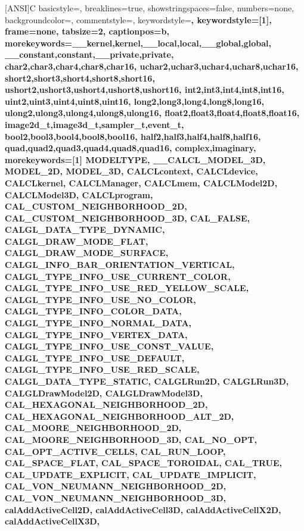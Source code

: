 \usepackage{verbatim}
\usepackage{xcolor}
\usepackage{listings}

 [ANSI]{C} 
{  basicstyle=\footnotesize\ttfamily,
	breaklines=true,
	showstringspaces=false,
	numbers=none,
	backgroundcolor=\color{white},
	commentstyle=\color{red},
	keywordstyle=\color{black}\bfseries,
	keywordstyle=[1]\color{black},   %
	frame=none,                     %
	tabsize=2,                      %
	captionpos=b,
	morekeywords={__kernel,kernel,__local,local,__global,global,%
		__constant,constant,__private,private,%
		char2,char3,char4,char8,char16,%
		uchar2,uchar3,uchar4,uchar8,uchar16,%
		short2,short3,short4,short8,short16,%
		ushort2,ushort3,ushort4,ushort8,ushort16,%
		int2,int3,int4,int8,int16,%
		uint2,uint3,uint4,uint8,uint16,%
		long2,long3,long4,long8,long16,%
		ulong2,ulong3,ulong4,ulong8,ulong16,%
		float2,float3,float4,float8,float16,%
		image2d_t,image3d_t,sampler_t,event_t,%
		bool2,bool3,bool4,bool8,bool16,%
		half2,half3,half4,half8,half16,%
		quad,quad2,quad3,quad4,quad8,quad16,%
		complex,imaginary},
	    morekeywords=[1]{               %
		MODELTYPE,
		__CALCL_MODEL_3D,
		MODEL_2D,
		MODEL_3D,
		CALCLcontext,
		CALCLdevice,
		CALCLkernel,
		CALCLManager,
		CALCLmem,
		CALCLModel2D,
		CALCLModel3D,
		CALCLprogram,
		CAL_CUSTOM_NEIGHBORHOOD_2D,
		CAL_CUSTOM_NEIGHBORHOOD_3D,
		CAL_FALSE,
		CALGL_DATA_TYPE_DYNAMIC,
		CALGL_DRAW_MODE_FLAT,
		CALGL_DRAW_MODE_SURFACE,
		CALGL_INFO_BAR_ORIENTATION_VERTICAL,
		CALGL_TYPE_INFO_USE_CURRENT_COLOR,
		CALGL_TYPE_INFO_USE_RED_YELLOW_SCALE,
		CALGL_TYPE_INFO_USE_NO_COLOR,
		CALGL_TYPE_INFO_COLOR_DATA,
		CALGL_TYPE_INFO_NORMAL_DATA,
		CALGL_TYPE_INFO_VERTEX_DATA,
		CALGL_TYPE_INFO_USE_CONST_VALUE,
		CALGL_TYPE_INFO_USE_DEFAULT,
		CALGL_TYPE_INFO_USE_RED_SCALE,
		CALGL_DATA_TYPE_STATIC,
		CALGLRun2D,
		CALGLRun3D,
		CALGLDrawModel2D,
		CALGLDrawModel3D,
		CAL_HEXAGONAL_NEIGHBORHOOD_2D,
		CAL_HEXAGONAL_NEIGHBORHOOD_ALT_2D,
		CAL_MOORE_NEIGHBORHOOD_2D,
		CAL_MOORE_NEIGHBORHOOD_3D,
		CAL_NO_OPT,
		CAL_OPT_ACTIVE_CELLS,
		CAL_RUN_LOOP,
		CAL_SPACE_FLAT,
		CAL_SPACE_TOROIDAL,
		CAL_TRUE,
		CAL_UPDATE_EXPLICIT,
		CAL_UPDATE_IMPLICIT,
		CAL_VON_NEUMANN_NEIGHBORHOOD_2D,
		CAL_VON_NEUMANN_NEIGHBORHOOD_3D,
		calAddActiveCell2D,
		calAddActiveCell3D,
		calAddActiveCellX2D,
		calAddActiveCellX3D,
}}
